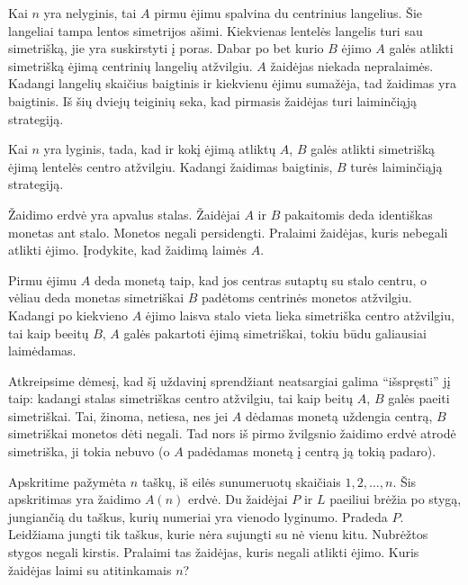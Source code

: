 \begin{sprendimas}
  Kai $n$ yra nelyginis, tai $A$ pirmu ėjimu spalvina du centrinius
  langelius. Šie langeliai tampa lentos simetrijos ašimi. Kiekvienas lentelės
  langelis turi sau simetrišką, jie yra suskirstyti į poras. Dabar po bet
  kurio $B$ ėjimo $A$ galės atlikti simetrišką ėjimą centrinių langelių
  atžvilgiu. $A$ žaidėjas niekada nepralaimės. Kadangi langelių skaičius
  baigtinis ir kiekvienu ėjimu sumažėja, tad žaidimas yra baigtinis. Iš šių
  dviejų teiginių seka, kad pirmasis žaidėjas turi laiminčiąją strategiją. 

  Kai $n$ yra lyginis, tada, kad ir kokį ėjimą atliktų $A$, $B$ galės atlikti
  simetrišką ėjimą lentelės centro atžvilgiu. Kadangi žaidimas baigtinis,
  $B$ turės laiminčiąją strategiją. 
\end{sprendimas}

\begin{pavnr}
  Žaidimo erdvė yra apvalus stalas. Žaidėjai $A$ ir $B$ pakaitomis deda
  identiškas monetas ant stalo. Monetos negali persidengti. Pralaimi
  žaidėjas, kuris nebegali atlikti ėjimo. Įrodykite, kad žaidimą laimės $A$. 
\end{pavnr}

\begin{sprendimas}
Pirmu ėjimu $A$ deda monetą taip, kad jos centras sutaptų su stalo centru, o
vėliau deda monetas simetriškai $B$ padėtoms centrinės monetos atžvilgiu.
Kadangi po kiekvieno $A$ ėjimo laisva stalo vieta lieka simetriška centro
atžvilgiu, tai kaip beeitų $B$, $A$ galės pakartoti ėjimą simetriškai,
tokiu būdu galiausiai laimėdamas.
\end{sprendimas}

\begin{pastaba}
  Atkreipsime dėmesį, kad šį uždavinį sprendžiant neatsargiai galima
  ``išspręsti'' jį taip: kadangi stalas simetriškas centro atžvilgiu, tai
  kaip beitų $A$, $B$ galės paeiti simetriškai. Tai, žinoma, netiesa, nes
  jei $A$ dėdamas monetą uždengia centrą, $B$ simetriškai monetos dėti
  negali. Tad nors iš pirmo žvilgsnio žaidimo erdvė atrodė simetriška, ji
  tokia nebuvo (o $A$ padėdamas monetą į centrą ją tokią padaro).
\end{pastaba}

\begin{pavnr}
  Apskritime pažymėta $n$ taškų, iš eilės sunumeruotų skaičiais $1,2,\ldots,n$. Šis
  apskritimas yra žaidimo $A(n)$ erdvė. Du žaidėjai $P$ ir $L$ paeiliui brėžia po
  stygą, jungiančią du taškus, kurių numeriai yra vienodo lyginumo. Pradeda
  $P$. Leidžiama jungti tik taškus, kurie nėra sujungti su nė vienu kitu.
  Nubrėžtos stygos negali kirstis. Pralaimi tas žaidėjas, kuris negali
  atlikti ėjimo. Kuris žaidėjas laimi su atitinkamais $n$?
\end{pavnr}

